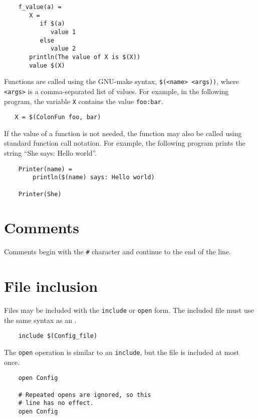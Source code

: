 \begin{verbatim}
    f_value(a) =
       X =
          if $(a)
             value 1
          else
             value 2
       println(The value of X is $(X))
       value $(X)
\end{verbatim}

Functions are called using the GNU-make syntax, \verb+$(<name> <args))+,
where \verb+<args>+ is a comma-separated list of values.  For example,
in the following program, the variable \verb+X+ contains the
value \verb+foo:bar+.

\begin{verbatim}
   X = $(ColonFun foo, bar)
\end{verbatim}

If the value of a function is not needed, the function may also be called
using standard function call notation.  For example, the following program
prints the string ``She says: Hello world''.

\begin{verbatim}
    Printer(name) =
        println($(name) says: Hello world)

    Printer(She)
\end{verbatim}

\section{Comments}

Comments begin with the \verb+#+ character and continue to the end of the line.

\section{File inclusion}
\label{section:include}

Files may be included with the \verb+include+ or \verb+open+ form.  The included file must use
the same syntax as an .

\begin{verbatim}
    include $(Config_file)
\end{verbatim}

The \verb+open+ operation is similar to an \verb+include+, but the file is included at most once.
\begin{verbatim}
    open Config

    # Repeated opens are ignored, so this
    # line has no effect.
    open Config
\end{verbatim}

